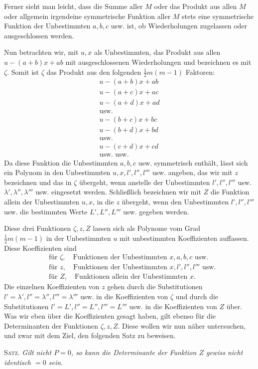 Ferner sieht man leicht, dass die Summe aller $M$ oder das Produkt aus allen $M$ oder allgemein irgendeine symmetrische Funktion aller $M$ stets eine symmetrische Funktion der Unbestimmten $a,b,c$ usw. ist, ob Wiederholungen zugelassen oder ausgeschlossen werden.

Nun betrachten wir, mit $u,x$ als Unbestimmten, das Produkt aus allen $u-(a+b)x+ab$ mit ausgeschlossenen Wiederholungen und bezeichnen es mit $\zeta$. Somit ist $\zeta$ das Produkt aus den folgenden \mbox{$\frac12m(m-1)$} Faktoren:
\[
\begin{gathered}
u-(a+b)x+ab\\
u-(a+c)x+ac\\
u-(a+d)x+ad\\
\text{usw.}\\
u-(b+c)x+bc\\
u-(b+d)x+bd\\
\text{usw.}\\
u-(c+d)x+cd\\
\text{usw. usw.}
\end{gathered}
\]
Da diese Funktion die Unbestimmten $a,b,c$ usw. symmetrisch enthält, lässt sich ein Polynom in den Unbestimmten $u,x,l',l'',l'''$ usw. angeben, das wir mit $z$ bezeichnen und das in $\zeta$ übergeht, wenn anstelle der Unbestimmten $l',l'',l'''$ usw. $\lambda',\lambda'',\lambda'''$ usw. eingesetzt werden. Schließlich bezeichnen wir mit $Z$ die Funktion allein der Unbestimmten $u,x$, in die $z$ übergeht, wenn den Unbestimmten $l',l'',l'''$ usw. die bestimmten Werte $L',L'',L'''$ usw. gegeben werden.

Diese drei Funktionen $\zeta,z,Z$ lassen sich als Polynome vom Grad\\
\mbox{$\frac12m(m-1)$} in der Unbestimmten $u$ mit unbestimmten Koeffizienten auffassen. Diese
Koeffizienten sind
\[
\begin{aligned}
&\text{für }\zeta,\quad\text{Funktionen der Unbestimmten }x,a,b,c\text{ usw.}\\
&\text{für }z,\quad\text{Funktionen der Unbestimmten }x,l',l'',l'''\text{ usw.}\\
&\text{für }Z,\quad\text{Funktionen allein der Unbestimmten }x.
\end{aligned}
\]
Die einzelnen Koeffizienten von $z$ gehen durch die Substitutionen $l'=\lambda',l''=\lambda'',l'''=\lambda'''$ usw. in die Koeffizienten von $\zeta$ und durch die Substitutionen $l'=L',l''=L'',l'''=L'''$ usw. in die Koeffizienten von $Z$ über. Was wir eben über die Koeffizienten gesagt haben, gilt ebenso für die Determinanten der Funktionen $\zeta,z,Z$. Diese wollen wir nun näher untersuchen, und zwar mit dem Ziel, den folgenden Satz zu beweisen.

\textsc{Satz.} \textit{Gilt nicht $P=0$, so kann die Determinante der Funktion $Z$ gewiss nicht identisch $=0$ sein.}

